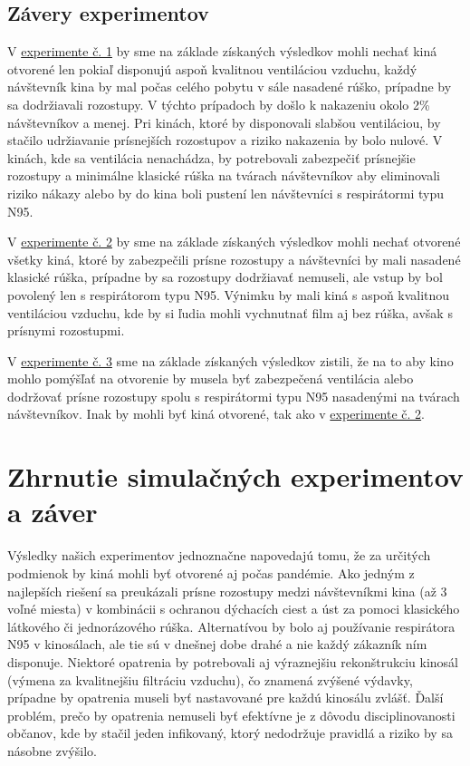 \documentclass[a4paper, 11pt]{article}
\begin{document}
    \subsection{Závery experimentov}
        V \hyperref[sec:ex.1]{experimente č. 1} by sme na základe získaných výsledkov mohli nechať kiná otvorené len pokiaľ disponujú aspoň kvalitnou ventiláciou vzduchu, každý návštevník kina by mal počas celého pobytu v sále nasadené rúško, prípadne by sa dodržiavali rozostupy. V týchto prípadoch by došlo k nakazeniu okolo 2\% návštevníkov a menej. Pri kinách, ktoré by disponovali slabšou ventiláciou, by stačilo udržiavanie prísnejších rozostupov a riziko nakazenia by bolo nulové. V kinách, kde sa ventilácia nenachádza, by potrebovali zabezpečiť prísnejšie rozostupy a minimálne klasické rúška na tvárach návštevníkov aby eliminovali riziko nákazy alebo by do kina boli pustení len návštevníci s respirátormi typu N95.
        \par V \hyperref[sec:ex.2]{experimente č. 2} by sme na základe získaných výsledkov mohli nechať otvorené všetky kiná, ktoré by zabezpečili prísne rozostupy a návštevníci by mali nasadené klasické rúška, prípadne by sa rozostupy dodržiavať nemuseli, ale vstup by bol povolený len s respirátorom typu N95. Výnimku by mali kiná s aspoň kvalitnou ventiláciou vzduchu, kde by si ľudia mohli vychnutnať film aj bez rúška, avšak s prísnymi rozostupmi.
        \par V \hyperref[sec:ex.2]{experimente č. 3} sme na základe získaných výsledkov zistili, že na to aby kino mohlo pomýšľať na otvorenie by musela byť zabezpečená ventilácia alebo dodržovať prísne rozostupy spolu s respirátormi typu N95 nasadenými na tvárach návštevníkov. Inak by mohli byť kiná otvorené, tak ako v \hyperref[sec:ex.2]{experimente č. 2}.
        
    \section{Zhrnutie simulačných experimentov a záver}
    Výsledky našich experimentov jednoznačne napovedajú tomu, že za určitých podmienok by kiná mohli byť otvorené aj počas pandémie. Ako jedným z najlepších riešení sa preukázali prísne rozostupy medzi návštevníkmi kina (až 3 voľné miesta) v kombinácii s ochranou dýchacích ciest a úst za pomoci klasického látkového či jednorázového rúška. Alternatívou by bolo aj používanie respirátora N95 v kinosálach, ale tie sú v dnešnej dobe drahé a nie každý zákazník ním disponuje. Niektoré opatrenia by potrebovali aj výraznejšiu rekonštrukciu kinosál (výmena za kvalitnejšiu filtráciu vzduchu), čo znamená zvýšené výdavky, prípadne by opatrenia museli byť nastavované pre každú kinosálu zvlášť. Ďalší problém, prečo by opatrenia nemuseli byť efektívne je z dôvodu disciplinovanosti občanov, kde by stačil jeden infikovaný, ktorý nedodržuje pravidlá a riziko by sa násobne zvýšilo.
    \newpage
    
    \renewcommand{\refname}{Bibliografia}
    \label{sec:bib}
    
\end{document}
